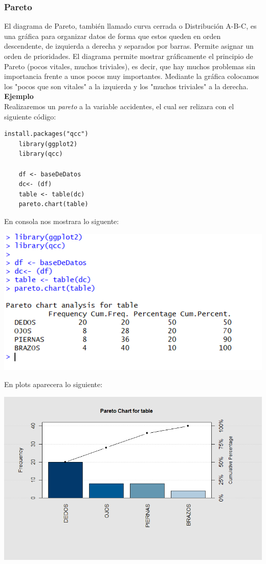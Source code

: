 \documentclass[12pt,hidelinks]{article}
\begin{document}
	\subsubsection{Pareto}
	El diagrama de Pareto, también llamado curva cerrada o Distribución A-B-C, es una gráfica para organizar datos de forma que estos queden en orden descendente, de izquierda a derecha y separados por barras. Permite asignar un orden de prioridades. El diagrama permite mostrar gráficamente el principio de Pareto (pocos vitales, muchos triviales), es decir, que hay muchos problemas sin importancia frente a unos pocos muy importantes. Mediante la gráfica colocamos los "pocos que son vitales" a la izquierda y los "muchos triviales" a la derecha.\\
	\textbf{Ejemplo}\\
	Realizaremos un \textit{pareto} a la variable accidentes, el cual ser relizara con el siguiente código:
	\begin{lstlisting}[frame=single]
	install.packages("qcc")
	library(ggplot2)
	library(qcc)
	
	df <- baseDeDatos
	dc<- (df)
	table <- table(dc)
	pareto.chart(table)
	\end{lstlisting}
	En consola nos mostrara lo siguente:
	\begin{center}
		\includegraphics[]{imgPareto.PNG}
	\end{center}
	En plots aparecera lo siguiente:
	\begin{center}
		\includegraphics[width = 15cm]{Gpareto.png}
	\end{center}
\end{document}
